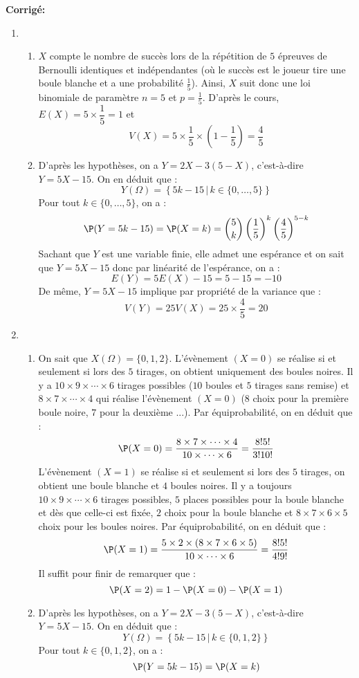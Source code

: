 \documentclass[a4paper,twoside,french,11pt]{VcCours}
\newcommand{\corr}{\textbf{Corrigé:}}
\begin{document}
\corr \begin{enumerate}
\item
\begin{enumerate}
\item $X$ compte le nombre de succès lors de la répétition de $5$ épreuves de Bernoulli identiques et indépendantes (où le succès est \og le joueur tire une boule blanche \fg et a une probabilité $\tfrac{1}{5}$). Ainsi, $X$ suit donc une loi binomiale de paramètre $n=5$ et $p=\tfrac{1}{5}$. D'après le cours, $E(X)=5\times\dfrac{1}{5}=1$ et 
$$V(X)=5\times\dfrac{1}{5}\times\left( 1-\dfrac{1}{5}\right)=\dfrac{4}{5}$$
 \item
  D'après les hypothèses, on a $Y=2X-3(5-X)$, c'est-à-dire $Y=5X-15$. On en déduit que :
  $$Y(\Omega)=\left\lbrace 5k-15 \, \vert \, k\in \lbrace 0, \ldots, 5\rbrace \right\rbrace $$
Pour tout $k \in  \lbrace 0, \ldots, 5\rbrace$, on a :
$$\P(Y=5k-15)= \P(X=k)=\binom{5}{k} \left(\dfrac{1}{5} \right)^k \left(\dfrac{4}{5}\right)^{5-k}$$
Sachant que $Y$ est une variable finie, elle admet une espérance et on sait que $Y=5X-15$ donc par linéarité de l'espérance, on a : 
$$E(Y)=5E(X)-15=5-15=-10$$
De même, $Y=5X-15$ implique par propriété de la variance que :
$$V(Y)=25V(X)=25\times\dfrac{4}{5}=20$$
\end{enumerate}
\item 
\begin{enumerate}
\item On sait que $X(\Omega) = \lbrace 0,1,2 \rbrace$. L'évènement $(X=0)$ se réalise si et seulement si lors des $5$ tirages, on obtient uniquement des boules noires. Il y a $10\times 9 \times \cdots \times 6$ tirages possibles ($10$ boules et $5$ tirages sans remise) et $8 \times 7 \times \cdots \times 4$ qui réalise l'évènement $(X=0)$ ($8$ choix pour la première boule noire, $7$ pour la deuxième ...). Par équiprobabilité, on en déduit que :
$$ \P(X=0) = \dfrac{8 \times 7 \times \cdots \times 4}{10 \times \cdots \times 6} = \dfrac{8! 5!}{3!10!}$$
L'évènement $(X=1)$ se réalise si et seulement si lors des $5$ tirages, on obtient une boule blanche et $4$ boules noires. Il y a toujours $10\times 9 \times \cdots \times 6$ tirages possibles, $5$ places possibles pour la boule blanche et dès que celle-ci est fixée, $2$ choix pour la boule blanche et $8 \times 7 \times 6 \times 5$ choix pour les boules noires. Par équiprobabilité, on en déduit que :
$$ \P(X=1) = \dfrac{5 \times 2 \times (8 \times 7 \times 6 \times 5)}{10 \times \cdots \times 6} = \dfrac{8!5!}{4!9!}$$
Il suffit pour finir de remarquer que :
$$ \P(X=2)= 1- \P(X=0)-\P(X=1)$$
\item  D'après les hypothèses, on a $Y=2X-3(5-X)$, c'est-à-dire $Y=5X-15$. On en déduit que :
  $$Y(\Omega)=\left\lbrace 5k-15 \, \vert \, k\in \lbrace 0, 1, 2\rbrace \right\rbrace $$
Pour tout $k \in  \lbrace 0, 1, 2\rbrace$, on a :
$$\P(Y=5k-15)= \P(X=k)$$


\end{enumerate}
\end{enumerate}
\end{document}
